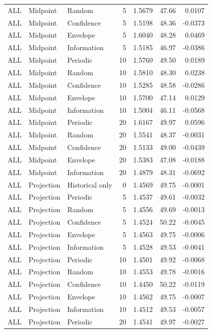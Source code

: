 \begin{longtable}{lllrrrr}
ALL & Midpoint & Random & 5 & 1.5679 & 47.66 & 0.0107 \\
ALL & Midpoint & Confidence & 5 & 1.5198 & 48.36 & -0.0373 \\
ALL & Midpoint & Envelope & 5 & 1.6040 & 48.28 & 0.0469 \\
ALL & Midpoint & Information & 5 & 1.5185 & 46.97 & -0.0386 \\
ALL & Midpoint & Periodic & 10 & 1.5760 & 49.50 & 0.0189 \\
ALL & Midpoint & Random & 10 & 1.5810 & 48.30 & 0.0238 \\
ALL & Midpoint & Confidence & 10 & 1.5285 & 48.58 & -0.0286 \\
ALL & Midpoint & Envelope & 10 & 1.5700 & 47.14 & 0.0129 \\
ALL & Midpoint & Information & 10 & 1.5004 & 46.11 & -0.0568 \\
ALL & Midpoint & Periodic & 20 & 1.6167 & 49.97 & 0.0596 \\
ALL & Midpoint & Random & 20 & 1.5541 & 48.37 & -0.0031 \\
ALL & Midpoint & Confidence & 20 & 1.5133 & 49.00 & -0.0439 \\
ALL & Midpoint & Envelope & 20 & 1.5383 & 47.08 & -0.0188 \\
ALL & Midpoint & Information & 20 & 1.4879 & 48.31 & -0.0692 \\
ALL & Projection & Historical only & 0 & 1.4569 & 49.75 & -0.0001 \\
ALL & Projection & Periodic & 5 & 1.4537 & 49.61 & -0.0032 \\
ALL & Projection & Random & 5 & 1.4556 & 49.69 & -0.0013 \\
ALL & Projection & Confidence & 5 & 1.4524 & 50.22 & -0.0045 \\
ALL & Projection & Envelope & 5 & 1.4563 & 49.75 & -0.0006 \\
ALL & Projection & Information & 5 & 1.4528 & 49.53 & -0.0041 \\
ALL & Projection & Periodic & 10 & 1.4501 & 49.92 & -0.0068 \\
ALL & Projection & Random & 10 & 1.4553 & 49.78 & -0.0016 \\
ALL & Projection & Confidence & 10 & 1.4450 & 50.22 & -0.0119 \\
ALL & Projection & Envelope & 10 & 1.4562 & 49.75 & -0.0007 \\
ALL & Projection & Information & 10 & 1.4512 & 49.53 & -0.0057 \\
ALL & Projection & Periodic & 20 & 1.4541 & 49.97 & -0.0027 \\

\end{longtable}
